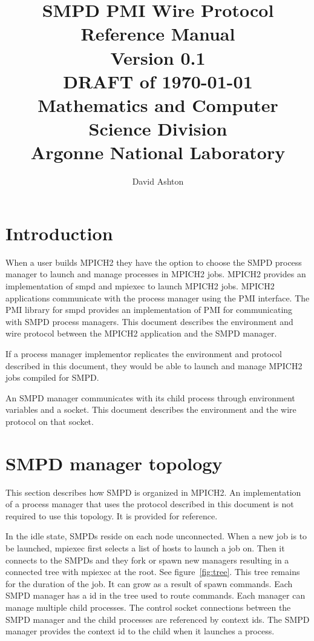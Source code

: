 \documentclass[dvipdfm,11pt]{article}
\begin{document}
\title{SMPD PMI Wire Protocol Reference Manual\\
Version 0.1\\
DRAFT of \today\\
Mathematics and Computer Science Division\\
Argonne National Laboratory}

\author{David Ashton}


\maketitle

\cleardoublepage

\tableofcontents
\clearpage

\pagestyle{headings}


\section{Introduction}

When a user builds MPICH2 they have the option to choose the SMPD process
manager to launch and manage processes in MPICH2 jobs.  MPICH2 provides
an implementation of smpd and mpiexec to launch MPICH2 jobs.  MPICH2 
applications communicate with the process manager using the PMI interface.
The PMI library for smpd provides an implementation of PMI for communicating
with SMPD process managers. This document describes the environment and wire
protocol between the MPICH2 application and the SMPD manager.

If a process manager implementor replicates the environment and protocol
described in this document, they would be able to launch and manage MPICH2 
jobs compiled for SMPD.

An SMPD manager communicates with its child process through environment
variables and a socket.  This document describes the environment and the 
wire protocol on that socket.

\section{SMPD manager topology}
This section describes how SMPD is organized in MPICH2.  An implementation
of a process manager that uses the protocol described in this document is 
not required to use this topology.  It is provided for reference.

In the idle state, SMPDs reside on each node unconnected.  
When a new job is to be launched, mpiexec first selects a list of hosts 
to launch a job on.  Then it connects to the SMPDs and they fork or spawn 
new managers resulting in a connected tree with mpiexec at the root.
See figure~\ref{fig:tree}.  This tree remains for the duration of the job.
It can grow as a result of spawn commands.  Each SMPD manager has
a id in the tree used to route commands.  Each manager can manage multiple
child processes.  The control socket connections between the SMPD manager
and the child processes are referenced by context ids.  The SMPD manager
provides the context id to the child when it launches a process.
\end{document}
